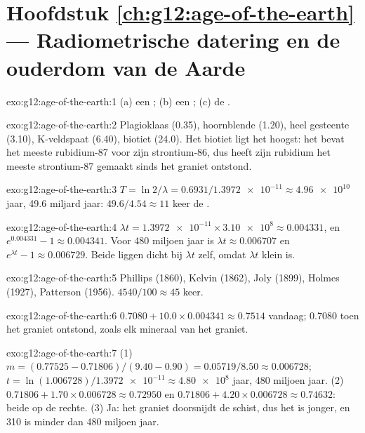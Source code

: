 \section*{Hoofdstuk \ref{ch:g12:age-of-the-earth} --- Radiometrische datering en de ouderdom van de Aarde}

\begin{solution}{exo:g12:age-of-the-earth:1}
(a) een ; (b) een ; (c) de .
\end{solution}

\begin{solution}{exo:g12:age-of-the-earth:2}
Plagioklaas (0.35), hoornblende (1.20), heel gesteente (3.10), K-veldspaat (6.40),
biotiet (24.0). Het biotiet ligt het hoogst: het bevat het meeste rubidium-87 voor
zijn strontium-86, dus heeft zijn rubidium het meeste strontium-87 gemaakt sinds het
graniet ontstond.
\end{solution}

\begin{solution}{exo:g12:age-of-the-earth:3}
$T = \ln 2/\lambda = 0.6931/\num{1.3972e-11} \approx \num{4.96e10}$ jaar,
49.6 miljard jaar: $49.6/4.54 \approx 11$ keer de .
\end{solution}

\begin{solution}{exo:g12:age-of-the-earth:4}
$\lambda t = \num{1.3972e-11} \times \num{3.10e8} \approx 0.004331$, en
$e^{0.004331} - 1 \approx 0.004341$. Voor 480 miljoen jaar is $\lambda t
\approx 0.006707$ en $e^{\lambda t} - 1 \approx 0.006729$. Beide liggen dicht bij
$\lambda t$ zelf, omdat $\lambda t$ klein is.
\end{solution}

\begin{solution}{exo:g12:age-of-the-earth:5}
Phillips (1860), Kelvin (1862), Joly (1899), Holmes (1927), Patterson
(1956). $4540/100 \approx 45$ keer.
\end{solution}

\begin{solution}{exo:g12:age-of-the-earth:6}
$0.7080 + 10.0 \times 0.004341 \approx 0.7514$ vandaag; 0.7080 toen het graniet
ontstond, zoals elk mineraal van het graniet.
\end{solution}

\begin{solution}{exo:g12:age-of-the-earth:7}
(1) $m = (0.77525 - 0.71806)/(9.40 - 0.90) = 0.05719/8.50 \approx 0.006728$;
$t = \ln(1.006728)/\num{1.3972e-11} \approx \num{4.80e8}$ jaar, 480 miljoen
jaar. (2) $0.71806 + 1.70 \times 0.006728 \approx 0.72950$ en $0.71806 + 4.20
\times 0.006728 \approx 0.74632$: beide op de rechte. (3) Ja: het graniet doorsnijdt
de schist, dus het is jonger, en 310 is minder dan 480 miljoen jaar.
\end{solution}

